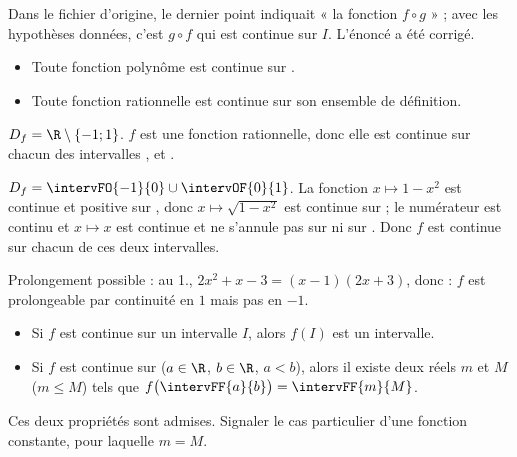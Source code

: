 \begin{noteprof}
Dans le fichier d'origine, le dernier point indiquait « la fonction $f\circ g$ » ; avec les hypothèses données, c'est $g\circ f$ qui est continue sur $I$. L'énoncé a été corrigé.
\end{noteprof}
\begin{exemple}[s]
	\begin{itemize}
			\item Toute fonction polynôme est continue sur \R.
			\item Toute fonction rationnelle est continue sur son ensemble de définition.
	\end{itemize}
\end{exemple}\vspace*{-0.5cm}
\fi %
\begin{corrigeprof}[8]
\be
\item $D_f=\R\setminus\{-1;1\}$. $f$ est une fonction rationnelle, donc elle est continue sur chacun des intervalles ,  et .
\item $D_f=\intervFO{-1}{0}\cup\intervOF{0}{1}$. La fonction $x\longmapsto 1-x^2$ est continue et positive sur , donc $x\longmapsto\sqrt{1-x^2}$ est continue sur  ; le numérateur est continu et $x\longmapsto x$ est continue et ne s'annule pas sur  ni sur . Donc $f$ est continue sur chacun de ces deux intervalles.
\ee
\end{corrigeprof}
\ifenseignant %
\begin{noteprof}
Prolongement possible : au 1., $2x^2+x-3=(x-1)(2x+3)$, donc  : $f$ est prolongeable par continuité en $1$ mais pas en $-1$.
\end{noteprof}
\begin{propriete}[s]
	\begin{itemize}
		\item Si $f$ est continue sur un intervalle $I$, alors $f(I)$ est un intervalle.
		\item Si $f$ est continue sur  ($a\in \R$, $b\in \R$, $a<b$), alors il existe deux réels $m$ et $M$ ($m\leq M$) tels que $f\big(\intervFF{a}{b}\big)=\intervFF{m}{M}$.
	\end{itemize}
\end{propriete}
\begin{noteprof}
Ces deux propriétés sont admises. Signaler le cas particulier d'une fonction constante, pour laquelle $m=M$.
\end{noteprof}

